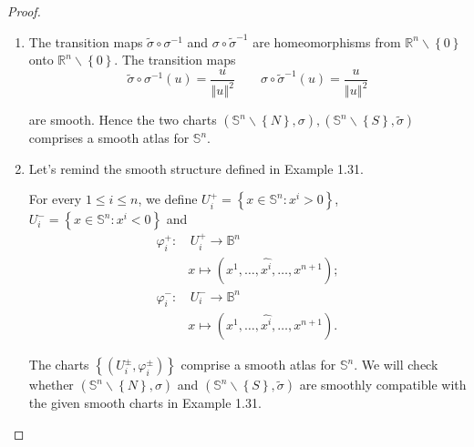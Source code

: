 \begin{proof}
\begin{enumerate}[itemsep=0pt,label={(\alph*)}]
              Two maps \( \sigma, \widetilde{\sigma} \) are homeomorphisms.
        \item The transition maps \( \widetilde{\sigma} \circ \sigma^{-1} \) and \( \sigma \circ \widetilde{\sigma}^{-1} \) are homeomorphisms from \( \mathbb{R}^{n} \smallsetminus \left\{0\right\} \) onto \( \mathbb{R}^{n} \smallsetminus \left\{0\right\} \). The transition maps
              \[
                  \widetilde{\sigma} \circ \sigma^{-1}(u) = \dfrac{u}{{\left\Vert u \right\Vert}^{2}} \qquad \sigma \circ \widetilde{\sigma}^{-1}(u) = \dfrac{u}{{\left\Vert u \right\Vert}^{2}}
              \]

              are smooth. Hence the two charts \( (\mathbb{S}^{n} \smallsetminus \left\{N\right\}, \sigma), (\mathbb{S}^{n} \smallsetminus \left\{S\right\}, \widetilde{\sigma}) \) comprises a smooth atlas for \( \mathbb{S}^{n} \).
        \item Let's remind the smooth structure defined in Example 1.31.

              For every \( 1 \le i \le n \), we define \( U_{i}^{+} = \left\{ x \in \mathbb{S}^{n}: x^{i} > 0 \right\} \), \( U_{i}^{-} = \left\{ x \in \mathbb{S}^{n}: x^{i} < 0 \right\} \) and
              \begingroup
              \allowdisplaybreaks%
              \begin{align*}
                  \varphi_{i}^{+}: & \, U_{i}^{+} \to \mathbb{B}^{n}                              \\
                                   & x \mapsto (x^{1}, \ldots, \widehat{x^{i}}, \ldots, x^{n+1}); \\
                  \varphi_{i}^{-}: & \, U_{i}^{-} \to \mathbb{B}^{n}                              \\
                                   & x \mapsto (x^{1}, \ldots, \widehat{x^{i}}, \ldots, x^{n+1}).
              \end{align*}
              \endgroup

              The charts \( \left\{ (U_{i}^{\pm}, \varphi_{i}^{\pm}) \right\} \) comprise a smooth atlas for \( \mathbb{S}^{n} \). We will check whether \( (\mathbb{S}^{n} \smallsetminus \left\{ N \right\}, \sigma) \) and \( (\mathbb{S}^{n} \smallsetminus \left\{ S \right\}, \widetilde{\sigma}) \) are smoothly compatible with the given smooth charts in Example 1.31.


\end{enumerate}
\end{proof}
